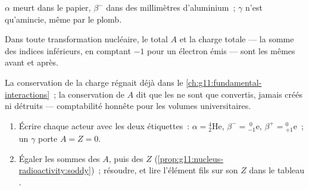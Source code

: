 \begin{omfigure}

{\small $\alpha$ meurt dans le papier, $\beta^-$ dans des millimètres
d'aluminium~; $\gamma$ n'est qu'amincie, même par le plomb.}
\end{omfigure}

\begin{proposition}\label{prop:g11:nucleus-radioactivity:soddy}
Dans toute transformation nucléaire, le
 total $A$ et la
charge totale --- la somme des indices inférieurs, en comptant $-1$ pour
un électron émis --- sont les mêmes avant et après.
\end{proposition}
\admitted

\begin{remark}
La conservation de la charge régnait déjà dans le
\cref{ch:g11:fundamental-interactions}~; la conservation de $A$ dit que
les  ne sont que
convertis, jamais créés ni détruits --- comptabilité honnête pour les
volumes universitaires.
\end{remark}

\begin{method}\label{met:g11:nucleus-radioactivity:balance}
\begin{enumerate}
  \item Écrire chaque acteur avec les deux étiquettes~:
        $\alpha = {}^{4}_{2}\mathrm{He}$,
        $\beta^- = {}^{\;0}_{-1}\mathrm{e}$,
        $\beta^+ = {}^{0}_{+1}\mathrm{e}$~; un $\gamma$ porte
        $A = Z = 0$.
  \item Égaler les sommes des $A$, puis des $Z$
        (\cref{prop:g11:nucleus-radioactivity:soddy})~; résoudre, et lire
        l'élément fils sur son $Z$ dans le
        tableau .
\end{enumerate}
\end{method}

